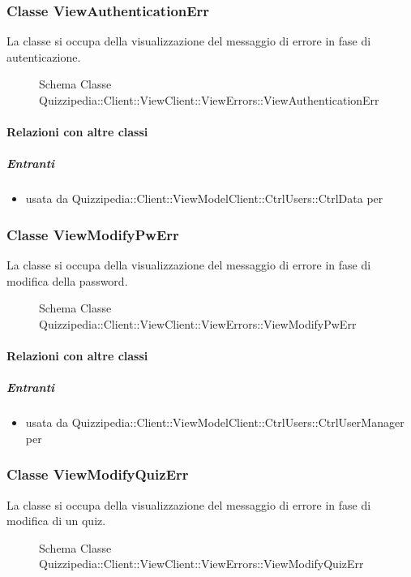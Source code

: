 \subsubsection{Classe ViewAuthenticationErr}
La classe si occupa della visualizzazione del messaggio di errore in fase di autenticazione.
\begin{figure}[H]
\centering
\noindent{}
\caption[Schema Classe ViewAuthenticationErr]{Schema Classe Quizzipedia::Client::ViewClient::ViewErrors::ViewAuthenticationErr}
\end{figure}
\paragraph{Relazioni con altre classi}
\subparagraph{Entranti}
\begin{itemize}
\item usata da Quizzipedia::Client::ViewModelClient::CtrlUsers::CtrlData per 
\end{itemize}
\subsubsection{Classe ViewModifyPwErr}
La classe si occupa della visualizzazione del messaggio di errore in fase di modifica della password.
\begin{figure}[H]
\centering
\noindent{}
\caption[Schema Classe ViewModifyPwErr]{Schema Classe Quizzipedia::Client::ViewClient::ViewErrors::ViewModifyPwErr}
\end{figure}
\paragraph{Relazioni con altre classi}
\subparagraph{Entranti}
\begin{itemize}
\item usata da Quizzipedia::Client::ViewModelClient::CtrlUsers::CtrlUserManager per 
\end{itemize}
\subsubsection{Classe ViewModifyQuizErr}
La classe si occupa della visualizzazione del messaggio di errore in fase di modifica di un quiz.
\begin{figure}[H]
\centering
\noindent{}
\caption[Schema Classe ViewModifyQuizErr]{Schema Classe Quizzipedia::Client::ViewClient::ViewErrors::ViewModifyQuizErr}
\end{figure}
